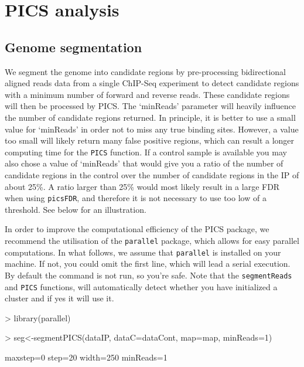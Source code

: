 \documentclass[a4paper]{article}
\begin{document}
\section{PICS analysis}

\subsection{Genome segmentation}
We segment the genome into candidate regions by pre-processing bidirectional aligned reads data from a single ChIP-Seq experiment to detect candidate regions with a minimum number of forward and reverse reads. These candidate regions will then be processed by PICS. The `minReads' parameter will heavily influence the number of candidate regions returned. In principle, it is better to use a small value for `minReads' in order not to miss any true binding sites. However, a value too small will likely return many false positive regions, which can result a longer computing time for the \texttt{PICS} function.  If a control sample is available you may also chose a value of `minReads' that would give you a ratio of the number of candidate regions in the control over the number of candidate regions in the IP of about 25\%. A ratio larger than 25\% would most likely result in a large FDR when using \texttt{picsFDR}, and therefore it is not necessary to use too low of a threshold. See below for an illustration.  \newline

In order to improve the computational efficiency of the PICS package, we recommend the utilisation of the \texttt{parallel} package, which allows for easy parallel computations. In what follows, we assume that \texttt{parallel} is installed on your machine. If not, you could omit the first line, which will lead a serial execution. By default the command is not run, so you're safe. Note that the \texttt{segmentReads} and \texttt{PICS} functions, will automatically detect whether you have initialized a cluster and if yes it will use it. 

\begin{Schunk}
\begin{Sinput}
> library(parallel)
\end{Sinput}
\end{Schunk}

\begin{Schunk}
\begin{Sinput}
> seg<-segmentPICS(dataIP, dataC=dataCont, map=map, minReads=1)
\end{Sinput}
\begin{Soutput}
maxstep=0
step=20
width=250
minReads=1
\end{Soutput}
\end{Schunk}
\end{document}
